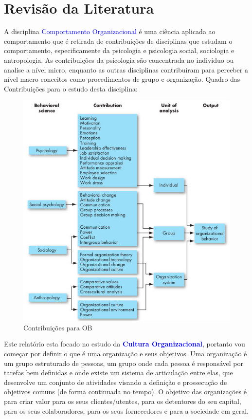 \section{Revisão da Literatura}
\qquad A disciplina \textcolor{blue}{Comportamento Organizacional} é uma ciência aplicada ao comportamento que é retirada de contribuições de disciplinas que estudam o comportamento, especificamente da psicologia e psicologia social, sociologia e antropologia.
As contribuições da psicologia são concentrada no individuo ou analise a nível micro, enquanto as outras disciplinas contribuíram para perceber a nível macro conceitos como procedimentos de grupo e organização.\cite{book_2}
\emptyline
Quadro das Contribuições para o estudo desta disciplina:
\begin{figure}[H]
\centering
\includegraphics[scale=0.52]{./image/OB/OB_contributions.jpg}
\caption{Contribuições para OB \cite{book_2}}
\end{figure}
Este relatório esta focado no estudo da \textcolor{blue}{\textbf{Cultura Organizacional}}, portanto vou começar por definir o que é uma organização e seus objetivos.
\emptyline
Uma organização é um grupo estruturado de pessoas, um grupo onde cada pessoa é responsável por tarefas bem definidas e onde existe um sistema de articulação entre elas, que desenvolve um conjunto de atividades visando a definição e prossecução de objetivos comuns (de forma continuada no tempo). O objetivo das organizações é para criar valor para os seus clientes/utentes, para os detentores do seu capital, para os seus colaboradores, para os seus fornecedores e para a sociedade em geral.\cite{book_10}
